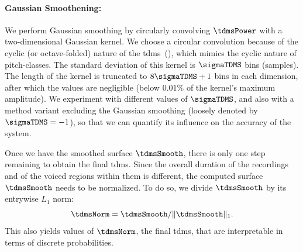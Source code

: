 \paragraph{Gaussian Smoothening:} We perform Gaussian smoothing by circularly convolving $\tdmsPower$ with a two-dimensional Gaussian kernel. We choose a circular convolution because of the cyclic (or octave-folded) nature of the \gls{tdms}~(), which mimics the cyclic nature of pitch-classes. The standard deviation of this kernel is $\sigmaTDMS$ bins (samples). The length of the kernel is truncated to $8\sigmaTDMS + 1$ bins in each dimension, after which the values are negligible (below $0.01\%$ of the kernel's maximum amplitude). We experiment with different values of $\sigmaTDMS$, and also with a method variant excluding the Gaussian smoothing (loosely denoted by $\sigmaTDMS = -1$), so that we can quantify its influence on the accuracy of the system. 
%

Once we have the smoothed surface $\tdmsSmooth$, there is only one step remaining to obtain the final \gls{tdms}. Since the overall duration of the recordings and of the voiced regions within them is different, the computed surface $\tdmsSmooth$ needs to be normalized. To do so, we divide $\tdmsSmooth$ by its entrywise $L_1$ norm:
\begin{equation}
\label{eq:tdms_normalization}
\tdmsNorm = \tdmsSmooth/\norm{\tdmsSmooth}_{1} .
\end{equation}
This also yields values of $\tdmsNorm$, the final \gls{tdms}, that are interpretable in terms of discrete probabilities.

